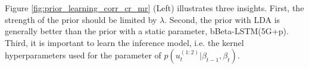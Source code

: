 \documentclass[letterpaper]{article} %
\begin{document}
Figure \ref{fig:prior_learning_corr_cr_mr} (Left) illustrates three insights. First, the strength of the prior should be limited by $\lambda$. Second, the prior with LDA is generally better than the prior with a static parameter, bBeta-LSTM(5G+p). Third, it is important to learn the inference model, i.e. the kernel hyperparameters used for the parameter of $p(u_{t}^{(1:2)}|\beta_{t-1},\beta_{t})$.

%
\end{document}
